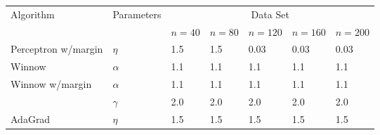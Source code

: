     \begin{table}[!hbp]
    \begin{tabular}{|p{4.7cm}<{\centering}|p{2.0cm}<{\centering}|p{1.5cm}<{\centering}|p{1.5cm}<{\centering}|p{1.5cm}<{\centering}|p{1.5cm}<{\centering}|p{1.5cm}<{\centering}|}
      \hline
      \multirow{2}{*}{Algorithm} & \multirow{2}{*}{Parameters} & \multicolumn{5}{|c|}{Data Set} \\
      \cline{3-7}
 & & $n=40$& $n=80$& $n=120$& $n=160$& $n=200$\\
 \hline
      Perceptron w/margin &          $\eta$          &1.5                   &1.5     &0.03 &0.03 &0.03                              \\\hline

      Winnow               &     $\alpha$           &1.1                     &1.1         &1.1 &1.1 &1.1                          \\\hline %
      \multirow{2}{*}{Winnow w/margin}     & $\alpha$&1.1                                     &1.1     &1.1 &1.1 &1.1                \\
      \cline{2-7}
      & $\gamma$ &2.0  &2.0 &2.0 &2.0 &2.0\\ \hline %
      AdaGrad             & $\eta$&1.5                                      &1.5               &1.5 &1.5 &1.5                    \\\hline %
    \end{tabular}
    \end{table}
    
